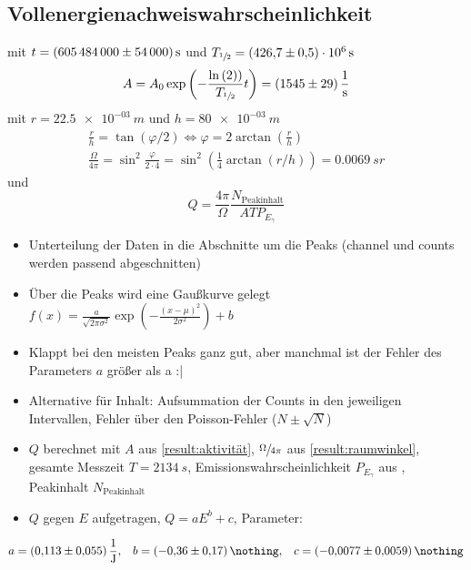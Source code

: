 \subsection{Vollenergienachweiswahrscheinlichkeit}
mit $t = \SI{605484000 (54000)}{s}$
und $T_{\sfrac{1}{2}} = \SI{426.7 (5) e+06}{s}$ %
\begin{equation}
	A = A_{0} \exp{\left( - \frac{\ln{(2))}}{T_{\sfrac{1}{2}}} t \right)} = \SI{1545(29)}{\per \second}
	\label{result:aktivität}
\end{equation}
mit $r=\SI{22.5e-03}{m}$
und $h = \SI{80e-03}{m}$
\begin{align*}
	\frac{r}{h} = \tan{( \varphi / 2 )} \Leftrightarrow \varphi = 2 \arctan{(\frac{r}{h})} \\
	\frac{\Omega}{4 \pi} = \sin^2{\frac{\varphi}{2 \cdot 4}} =  \sin^2{ \left( \frac{1}{4} \arctan{(r/h)} \right)} = \SI{0.0069}{sr}
	\label{result:raumwinkel}
\end{align*}
und
\begin{equation}
	Q = \frac{4 \pi}{\Omega} \frac{N_{\text{Peakinhalt}}}{ A T P_{E_{\gamma}}}
\end{equation}



\begin{itemize}
	\item Unterteilung der Daten in die Abschnitte um die Peaks (channel und counts werden passend abgeschnitten)
	\item Über die Peaks wird eine Gaußkurve gelegt $f (x) = \frac{a}{\sqrt{2 \pi \sigma^2}} \exp{\left( - \frac{(x-\mu)^2}{2 \sigma^2} \right)}+b$
	\item Klappt bei den meisten Peaks ganz gut, aber manchmal ist der Fehler des Parameters $a$ größer als a :|
	\item Alternative für Inhalt: Aufsummation der Counts in den jeweiligen Intervallen, Fehler über den Poisson-Fehler ($N \pm \sqrt{N}$)
	\item $Q$ berechnet mit $A$ aus \eqref{result:aktivität}, $\sfrac{\Omega}{4 \pi}$ aus \eqref{result:raumwinkel},
	gesamte Messzeit $T=\SI{2134}{s}$, Emissionswahrscheinlichkeit $P_{E_{\gamma}}$ aus \cite{nucleide}, Peakinhalt $N_{\text{Peakinhalt}}$
	\item $Q$ gegen $E$ aufgetragen, $Q=a E^{b} + c$, Parameter:
\end{itemize}
\begin{align*}
	a = \SI{0.113 (55)}{\frac{1}{J}}, && b = \SI{-0.36 (17)}{\nothing}, && c = \SI{-0.0077 (59)}{\nothing}
\end{align*}

